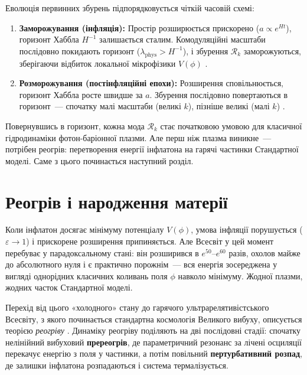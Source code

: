 \documentclass[12pt, a4paper]{article}
\begin{document}
Еволюція первинних збурень підпорядковується чіткій часовій
схемі:
\begin{enumerate}
  \item \textbf{Заморожування (інфляція):} Простір розширюється
        прискорено ($a \propto e^{Ht}$), горизонт Хаббла
        $H^{-1}$ залишається сталим. Комодуляційні масштаби
        послідовно покидають горизонт ($\lambda_\mathrm{phys} >
        H^{-1}$), і збурення $\mathcal{R}_k$ заморожуються,
        зберігаючи відбиток локальної мікрофізики $V(\phi)$
        \cite{bardeen_1980}.
  \item \textbf{Розморожування (постінфляційні епохи):}
        Розширення сповільнюється, горизонт Хаббла росте
        швидше за $a$. Збурення послідовно повертаються в
        горизонт~--- спочатку малі масштаби (великі $k$),
        пізніше великі (малі $k$) \cite{mukhanov_2005}.
\end{enumerate}

Повернувшись в горизонт, кожна мода $\mathcal{R}_k$ стає
початковою умовою для класичної гідродинаміки фотон-баріонної
плазми. Але перш ніж плазма виникне~--- потрібен реогрів:
перетворення енергії інфлатона на гарячі частинки Стандартної
моделі. Саме з цього починається наступний розділ.


\section{Реогрів і народження матерії}
\label{sec:reheating}

Коли інфлатон досягає мінімуму потенціалу $V(\phi)$, умова
інфляції порушується ($\varepsilon \to 1$) і прискорене
розширення припиняється. Але Всесвіт у цей момент
перебуває у парадоксальному стані: він розширився в
$e^{50}$--$e^{60}$ разів, охолов майже до абсолютного нуля
і є практично порожнім~--- вся енергія зосереджена у
вигляді однорідних класичних коливань поля $\phi$ навколо
мінімуму. Жодної плазми, жодних часток Стандартної моделі.

Перехід від цього «холодного» стану до гарячого
ультрарелятивістського Всесвіту, з якого починається
стандартна космологія Великого вибуху, описується теорією
\emph{реогріву} \cite{linde_1982, albrecht_1982}. Динаміку
реогріву поділяють на дві послідовні стадії: спочатку
нелінійний вибуховий \textbf{пререогрів}, де параметричний
резонанс за лічені осциляції перекачує енергію з поля у
частинки, а потім повільний \textbf{пертурбативний розпад},
де залишки інфлатона розпадаються і система термалізується.
\end{document}
